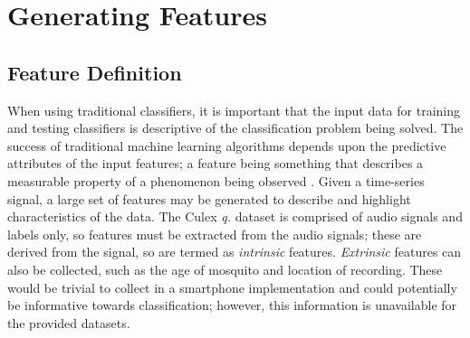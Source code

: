 \section{Generating Features}
\label{sec:pl-feats}
    \subsection{Feature Definition}
    \label{subsec:pl-feats-def}
        When using traditional classifiers, it is important that the input data for training and testing classifiers is descriptive of the classification problem being solved. The success of traditional machine learning algorithms depends upon the predictive attributes of the input features; a feature being something that describes a measurable property of a phenomenon being observed \cite{Bishop2006}. Given a time-series signal, a large set of features may be generated to describe and highlight characteristics of the data. The Culex \textit{q.} dataset is comprised of audio signals and labels only, so features must be extracted from the audio signals; these are derived from the signal, so are termed as \textit{intrinsic} features. \textit{Extrinsic} features can also be collected, such as the age of mosquito and location of recording. These would be trivial to collect in a smartphone implementation and could potentially be informative towards classification; however, this information is unavailable for the provided datasets.
        
